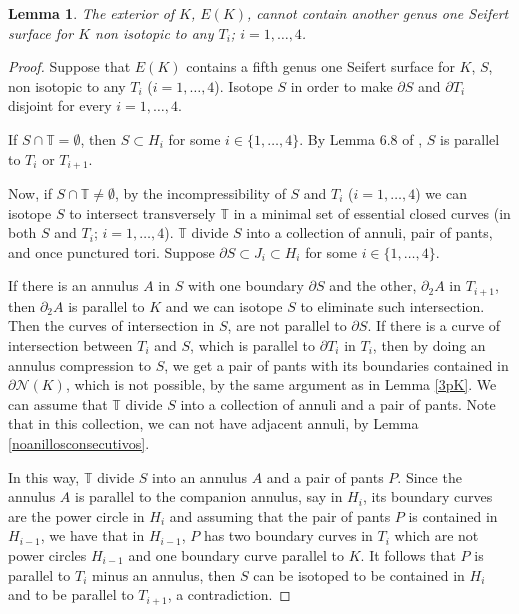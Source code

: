 \documentclass[12pt]{amsart}
\newtheorem{lema}{Lemma}
\begin{document}
\begin{lema}\label{4S}
The exterior of $K$, $E(K)$, cannot contain another genus one Seifert surface for $K$ non isotopic to any $T_{i}$; $i=1,\ldots, 4$.
\end{lema}
\begin{proof}
Suppose that $E(K)$ contains a fifth genus one Seifert surface for $K$, $S$, non isotopic to any $T_i$ ($i=1,\ldots, 4$). Isotope $S$ in order to make $\partial S$ and $\partial T_i$ disjoint for every $i=1,\ldots, 4$. 

If $S\cap\mathbb{T}=\emptyset$, then $S\subset H_i$ for some $i\in\{1,\ldots,4\}$. By Lemma $6.8$ of \cite{Tejano}, $S$ is parallel to $T_i$ or $T_{i+1}$.

Now, if $S\cap\mathbb{T}\neq\emptyset$, by the incompressibility of $S$ and $T_i$ ($i=1,\ldots, 4$) we can isotope $S$ to intersect transversely $\mathbb{T}$ in a minimal set of essential closed curves (in both $S$ and $T_i$; $i=1,\ldots, 4$). $\mathbb{T}$ divide $S$ into a collection of annuli, pair of pants, and once punctured tori. Suppose $\partial S \subset J_i \subset H_i$ for some $i\in\{1,\ldots,4\}$. 

If there is an annulus $A$ in $S$ with one boundary $\partial S$ and the other, $\partial_2 A$ in $T_{i+1}$, then $\partial_2 A$ is parallel to $K$ and we can isotope $S$ to eliminate such intersection. Then the curves of intersection in $S$, are not parallel to $\partial S$. If there is a curve of intersection between $T_i$ and $S$, which is parallel to $\partial T_i$ in $T_i$, then by doing an annulus compression to $S$, we get a pair of pants with its boundaries contained in $\partial \mathcal{N}(K)$, which is not possible, by the same argument as in Lemma \ref{3pK}. 
We can assume that $\mathbb{T}$ divide $S$ into a collection of annuli and a pair of pants. Note that in this collection, we can not have adjacent annuli, by Lemma \ref{noanillosconsecutivos}. 

In this way, $\mathbb{T}$ divide $S$ into an annulus $A$ and a pair of pants $P$. Since the annulus $A$ is parallel to the companion annulus, say in $H_i$, its boundary curves are the  power circle in $H_i$ and assuming that the pair of pants $P$ is contained in $H_{i-1}$, we have that in $H_{i-1}$, $P$ has two boundary curves in $T_i$ which are not power circles $H_{i-1}$ and one boundary curve parallel to $K$. It follows that $P$ is parallel to $T_{i}$ minus an annulus, then $S$ can be isotoped to be contained in $H_i$ and to be parallel to $T_{i+1}$, a contradiction.    
\end{proof}
\end{document}
